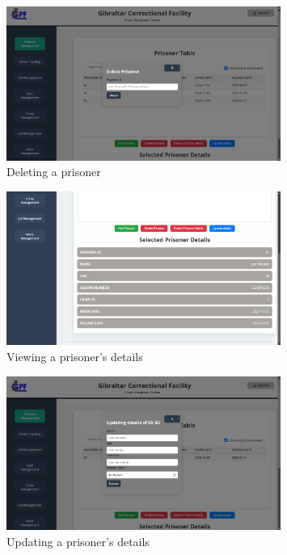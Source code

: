     \begin{figure}[H]
        \centering
        \includegraphics[width=0.8\textwidth]{screenshots/deleteprisoner.png}
        \caption{Deleting a prisoner}
        \label{fig:delprisoner}
    \end{figure}
    \begin{figure}[H]
        \centering
        \includegraphics[width=0.8\textwidth]{screenshots/prisonerdetails.png}
        \caption{Viewing a prisoner's details}
        \label{fig:pdet}
    \end{figure}
    \begin{figure}[H]
        \centering
        \includegraphics[width=0.8\textwidth]{screenshots/updatedetails.png}
        \caption{Updating a prisoner's details}
        \label{fig:updtp}
    \end{figure}
